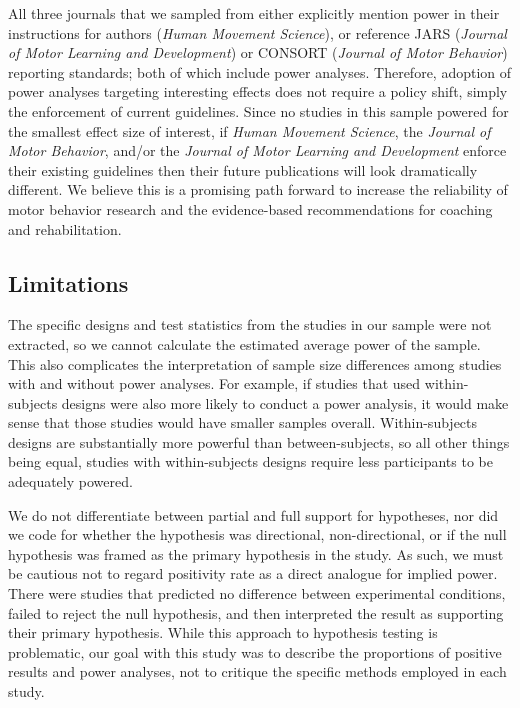\documentclass[
  man, donotrepeattitle,mask,floatsintext]{apa7}
\begin{document}
All three journals that we sampled from either explicitly mention power in their instructions for authors (\emph{Human Movement Science}), or reference JARS (\emph{Journal of Motor Learning and Development}) or CONSORT (\emph{Journal of Motor Behavior}) reporting standards; both of which include power analyses. Therefore, adoption of power analyses targeting interesting effects does not require a policy shift, simply the enforcement of current guidelines. Since no studies in this sample powered for the smallest effect size of interest, if \emph{Human Movement Science}, the \emph{Journal of Motor Behavior}, and/or the \emph{Journal of Motor Learning and Development} enforce their existing guidelines then their future publications will look dramatically different. We believe this is a promising path forward to increase the reliability of motor behavior research and the evidence-based recommendations for coaching and rehabilitation.

\hypertarget{limitations}{%
\subsection{Limitations}\label{limitations}}

The specific designs and test statistics from the studies in our sample were not extracted, so we cannot calculate the estimated average power of the sample. This also complicates the interpretation of sample size differences among studies with and without power analyses. For example, if studies that used within-subjects designs were also more likely to conduct a power analysis, it would make sense that those studies would have smaller samples overall. Within-subjects designs are substantially more powerful than between-subjects, so all other things being equal, studies with within-subjects designs require less participants to be adequately powered.

We do not differentiate between partial and full support for hypotheses, nor did we code for whether the hypothesis was directional, non-directional, or if the null hypothesis was framed as the primary hypothesis in the study. As such, we must be cautious not to regard positivity rate as a direct analogue for implied power. There were studies that predicted no difference between experimental conditions, failed to reject the null hypothesis, and then interpreted the result as supporting their primary hypothesis. While this approach to hypothesis testing is problematic, our goal with this study was to describe the proportions of positive results and power analyses, not to critique the specific methods employed in each study.
\end{document}
